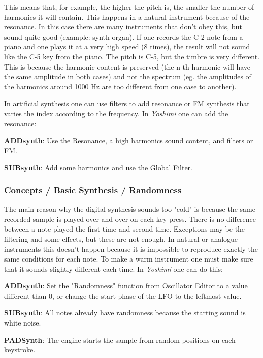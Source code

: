    This means that, for example, the higher the pitch is, the smaller the
   number of harmonics it will contain. This happens in a natural instrument
   because of the resonance. 
   In this case there are many instruments that don't obey this, but sound
   quite good (example: synth organ). 
   If one records the C-2 note from a piano and one plays it at a very high
   speed (8 times), the result will not sound like the C-5 key from the
   piano. The pitch is C-5, but the timbre is very different. This is because
   the harmonic content is preserved (the n-th harmonic will have the
   same amplitude in both cases) and not the spectrum (eg. the
   amplitudes of the harmonics around 1000 Hz are too different from
   one case to another). 

   In artificial synthesis one can use filters to add resonance or FM
   synthesis that varies the index according to the frequency.  In
   \textsl{Yoshimi} one can add the resonance:

   \begin{enumber}
      \item \textbf{ADDsynth}:
      Use the Resonance, a high harmonics sound content, and filters or FM.
      \item \textbf{SUBsynth}:
      Add some harmonics and use the Global Filter.
   \end{enumber}

\subsubsection{Concepts / Basic Synthesis / Randomness}
\label{subsubsec:concepts_basics_randomness}

   The main reason why the digital synthesis sounds too "cold" is because the
   same recorded sample is played over and over on each key-press.  There is
   no difference between a note played the first time and second time.
   Exceptions may be the filtering and some effects, but these are not
   enough. In natural or analogue instruments this doesn't happen because
   it is impossible to reproduce exactly the same conditions for each
   note. To make a warm instrument one must make sure that it sounds
   slightly different each time. In \textsl{Yoshimi}
   one can do this:

   \begin{enumber}
      \item \textbf{ADDsynth}:
      Set the "Randomness" function from Oscillator Editor
      to a value different than 0, or change the start phase of the LFO to
      the leftmost value.
      \item \textbf{SUBsynth}:
      All notes already have randomness because the
      starting sound is white noise.
      \item \textbf{PADSynth}:
      The engine starts the sample from random positions
      on each keystroke.
   \end{enumber}

